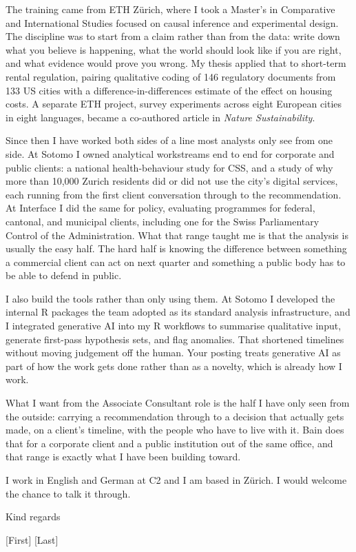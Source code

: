 \documentclass[10.5pt,a4paper]{article}
\begin{document}
The training came from ETH Zürich, where I took a Master's in Comparative and International Studies focused on causal inference and experimental design. The discipline was to start from a claim rather than from the data: write down what you believe is happening, what the world should look like if you are right, and what evidence would prove you wrong. My thesis applied that to short-term rental regulation, pairing qualitative coding of 146 regulatory documents from 133 US cities with a difference-in-differences estimate of the effect on housing costs. A separate ETH project, survey experiments across eight European cities in eight languages, became a co-authored article in \textit{Nature Sustainability}.

Since then I have worked both sides of a line most analysts only see from one side. At Sotomo I owned analytical workstreams end to end for corporate and public clients: a national health-behaviour study for CSS, and a study of why more than 10,000 Zurich residents did or did not use the city's digital services, each running from the first client conversation through to the recommendation. At Interface I did the same for policy, evaluating programmes for federal, cantonal, and municipal clients, including one for the Swiss Parliamentary Control of the Administration. What that range taught me is that the analysis is usually the easy half. The hard half is knowing the difference between something a commercial client can act on next quarter and something a public body has to be able to defend in public.

I also build the tools rather than only using them. At Sotomo I developed the internal R packages the team adopted as its standard analysis infrastructure, and I integrated generative AI into my R workflows to summarise qualitative input, generate first-pass hypothesis sets, and flag anomalies. That shortened timelines without moving judgement off the human. Your posting treats generative AI as part of how the work gets done rather than as a novelty, which is already how I work.

What I want from the Associate Consultant role is the half I have only seen from the outside: carrying a recommendation through to a decision that actually gets made, on a client's timeline, with the people who have to live with it. Bain does that for a corporate client and a public institution out of the same office, and that range is exactly what I have been building toward.

I work in English and German at C2 and I am based in Zürich. I would welcome the chance to talk it through.

\vspace{0.2em}

Kind regards

\vspace{0.7em}

[First] [Last]
\end{document}
